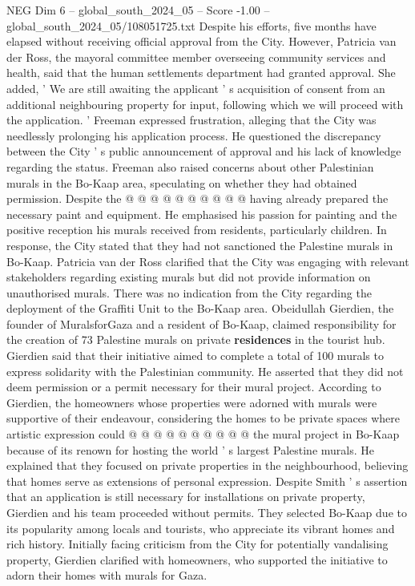\begin{textsample}{NEG Dim 6 – global\_south\_2024\_05 – Score -1.00 – global\_south\_2024\_05/108051725.txt}
Despite his efforts, five months have elapsed without receiving official approval from the City.
However, Patricia van der Ross, the mayoral committee member overseeing community services and health, said that the human settlements department had granted approval.
She added, ' We are still awaiting the applicant ' s acquisition of consent from an additional neighbouring property for input, following which we will proceed with the application. ' Freeman expressed frustration, alleging that the City was needlessly prolonging his application process.
He questioned the discrepancy between the City ' s public announcement of approval and his lack of knowledge regarding the status.
Freeman also raised concerns about other Palestinian murals in the Bo-Kaap area, speculating on whether they had obtained permission.
Despite the @ @ @ @ @ @ @ @ @ @ having already prepared the necessary paint and equipment.
He emphasised his passion for painting and the positive reception his murals received from residents, particularly children.
In response, the City stated that they had not sanctioned the Palestine murals in Bo-Kaap.
Patricia van der Ross clarified that the City was engaging with relevant stakeholders regarding existing murals but did not provide information on unauthorised murals.
There was no indication from the City regarding the deployment of the Graffiti Unit to the Bo-Kaap area.
Obeidullah Gierdien, the founder of MuralsforGaza and a resident of Bo-Kaap, claimed responsibility for the creation of 73 Palestine murals on private \textbf{residences} in the tourist hub.
Gierdien said that their initiative aimed to complete a total of 100 murals to express solidarity with the Palestinian community.
He asserted that they did not deem permission or a permit necessary for their mural project.
According to Gierdien, the homeowners whose properties were adorned with murals were supportive of their endeavour, considering the homes to be private spaces where artistic expression could @ @ @ @ @ @ @ @ @ @ the mural project in Bo-Kaap because of its renown for hosting the world ' s largest Palestine murals.
He explained that they focused on private properties in the neighbourhood, believing that homes serve as extensions of personal expression.
Despite Smith ' s assertion that an application is still necessary for installations on private property, Gierdien and his team proceeded without permits.
They selected Bo-Kaap due to its popularity among locals and tourists, who appreciate its vibrant homes and rich history.
Initially facing criticism from the City for potentially vandalising property, Gierdien clarified with homeowners, who supported the initiative to adorn their homes with murals for Gaza.

\end{textsample}
